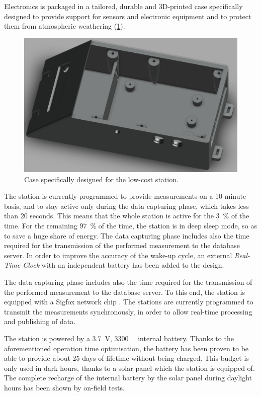 \documentclass[authoryear,preprint,review,12pt]{elsarticle}
\begin{document}
Electronics is packaged in a tailored, durable and 3D-printed case specifically designed to provide support for sensors and electronic equipment and to protect them from atmospheric weathering (\cref{fig:tailored-case}).
\begin{figure}
    \centering
    \includegraphics[scale=.20]{tailored-case.png} %
    \caption{Case specifically designed for the low-cost station.}
    \label{fig:tailored-case}
\end{figure}

The station is currently programmed to provide measurements on a 10-minute basis, and to stay active only during the data capturing phase, which takes less than 20 seconds. This means that the whole station is active for the \SI{3}{\%} of the time. For the remaining \SI{97}{\%} of the time, the station is in deep sleep mode, so as to save a huge share of energy. The data capturing phase includes also the time required for the transmission of the performed measurement to the database server. %
In order to improve the accuracy of the wake-up cycle, an external \emph{Real-Time Clock} with an independent battery \cite{maxim:rtc} has been added to the design.

The data capturing phase includes also the time required for the transmission of the performed measurement to the database server. To this end, the station is equipped with a Sigfox network chip \cite{sigfox:module}. The stations are currently programmed to transmit the measurements synchronously, in order to allow real-time processing and publishing of data.

The station is powered by a \SI{3.7}{\volt}, \SI{3300}{\milli\amperehour} internal battery. Thanks to the aforementioned operation time optimisation, the battery has been proven to be able to provide about 25 days of lifetime without being charged. This budget is only used in dark hours, thanks to a solar panel which the station is equipped of. 
The complete recharge of the internal battery by the solar panel during daylight hours has been shown by on-field tests.
\end{document}
